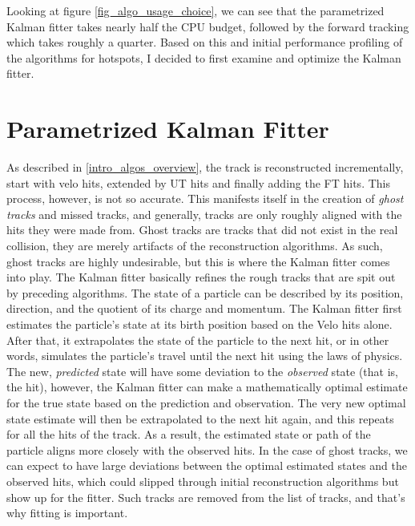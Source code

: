 \documentclass[12pt]{article}
\begin{document}
Looking at figure \ref{fig_algo_usage_choice}, we can see that the parametrized Kalman fitter takes nearly half the CPU budget, followed by the forward tracking which takes roughly a quarter. Based on this and initial performance profiling of the algorithms for hotspots, I decided to first examine and optimize the Kalman fitter. 

\section{Parametrized Kalman Fitter}

As described in \ref{intro_algos_overview}, the track is reconstructed incrementally, start with velo hits, extended by UT hits and finally adding the FT hits. This process, however, is not so accurate. This manifests itself in the creation of \textit{ghost tracks} and missed tracks, and generally, tracks are only roughly aligned with the hits they were made from. Ghost tracks are tracks that did not exist in the real collision, they are merely artifacts of the reconstruction algorithms. As such, ghost tracks are highly undesirable, but this is where the Kalman fitter comes into play. 
The Kalman fitter basically refines the rough tracks that are spit out by preceding algorithms. The state of a particle can be described by its position, direction, and the quotient of its charge and momentum. The Kalman fitter first estimates the particle's state at its birth position based on the Velo hits alone. After that, it extrapolates the state of the particle to the next hit, or in other words, simulates the particle's travel until the next hit using the laws of physics. The new, \textit{predicted} state will have some deviation to the \textit{observed} state (that is, the hit), however, the Kalman fitter can make a mathematically optimal estimate for the true state based on the prediction and observation. The very new optimal state estimate will then be extrapolated to the next hit again, and this repeats for all the hits of the track.
As a result, the estimated state or path of the particle aligns more closely with the observed hits. In the case of ghost tracks, we can expect to have large deviations between the optimal estimated states and the observed hits, which could slipped through initial reconstruction algorithms but show up for the fitter. Such tracks are removed from the list of tracks, and that's why fitting is important.	
\end{document}
